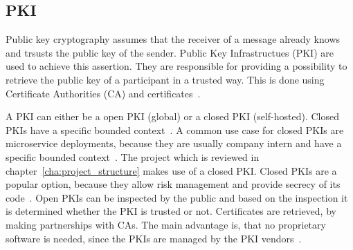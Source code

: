 \subsection{PKI}
Public key cryptography assumes that the receiver of a message already knows and trsusts the public key of the sender.
Public Key Infrastructues (PKI) are used to achieve this assertion.
They are responsible for providing a possibility to retrieve the public key of a participant in a trusted way.
This is done using Certificate Authorities (CA) and certificates~\cite{anderson2020security}.

A PKI can either be a open PKI (global) or a closed PKI (self-hosted).
Closed PKIs have a specific bounded context~\cite{hlavaty2003risk}.
A common use case for closed PKIs are microservice deployments, because they are usually company intern and have a specific bounded context~\cite{dias2020microservices}.
The project which is reviewed in chapter~\ref{cha:project_structure} makes use of a closed PKI.
Closed PKIs are a popular option, because they allow risk management and provide secrecy of its code~\cite{hlavaty2003risk}.
Open PKIs can be inspected by the public and based on the inspection it is determined whether the PKI is trusted or not.
Certificates are retrieved, by making partnerships with CAs.
The main advantage is, that no proprietary software is needed, since the PKIs are managed by the PKI vendors~\cite{hlavaty2003risk}.

